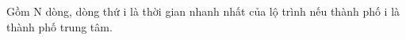 Gồm N dòng, dòng thứ i là thời gian nhanh nhất của lộ trình nếu thành phố i là thành phố trung tâm.  

\